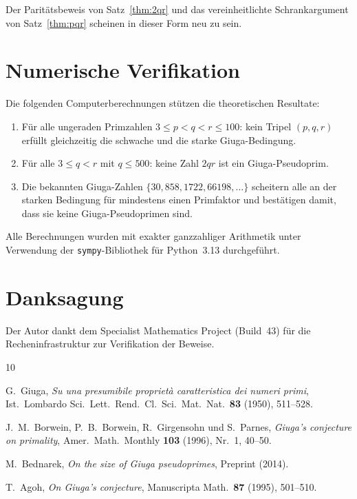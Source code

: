 \documentclass[12pt,a4paper]{amsart}
\theoremstyle{definition}
\begin{document}
Der Paritätsbeweis von Satz~\ref{thm:2qr} und das vereinheitlichte
Schrankargument von Satz~\ref{thm:pqr} scheinen in dieser Form neu zu sein.

\section{Numerische Verifikation}

Die folgenden Computerberechnungen stützen die theoretischen Resultate:

\begin{enumerate}
  \item Für alle ungeraden Primzahlen $3 \le p < q < r \le 100$: kein Tripel $(p, q, r)$
        erfüllt gleichzeitig die schwache und die starke Giuga-Bedingung.
  \item Für alle $3 \le q < r$ mit $q \le 500$: keine Zahl $2qr$ ist ein
        Giuga-Pseudoprim.
  \item Die bekannten Giuga-Zahlen $\{30, 858, 1722, 66198, \ldots\}$ scheitern
        alle an der starken Bedingung für mindestens einen Primfaktor und bestätigen
        damit, dass sie keine Giuga-Pseudoprimen sind.
\end{enumerate}

Alle Berechnungen wurden mit exakter ganzzahliger Arithmetik unter Verwendung der
\texttt{sympy}-Bibliothek für Python~3.13 durchgeführt.

\section*{Danksagung}

Der Autor dankt dem Specialist Mathematics Project (Build~43) für die
Recheninfrastruktur zur Verifikation der Beweise.

\begin{thebibliography}{10}

G.~Giuga,
\emph{Su una presumibile propriet\`a caratteristica dei numeri primi},
Ist.\ Lombardo Sci.\ Lett.\ Rend.\ Cl.\ Sci.\ Mat.\ Nat.\ \textbf{83}
(1950), 511--528.

J.~M.~Borwein, P.~B.~Borwein, R.~Girgensohn und S.~Parnes,
\emph{Giuga's conjecture on primality},
Amer.\ Math.\ Monthly \textbf{103} (1996), Nr.\ 1, 40--50.

M.~Bednarek,
\emph{On the size of Giuga pseudoprimes},
Preprint (2014).

T.~Agoh,
\emph{On Giuga's conjecture},
Manuscripta Math.\ \textbf{87} (1995), 501--510.

\end{thebibliography}
\end{document}
